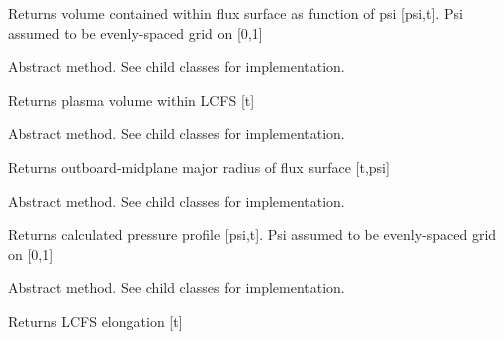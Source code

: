 \documentclass[letterpaper,10pt,english]{sphinxmanual}
\begin{document}
\begin{fulllineitems}
\begin{fulllineitems}
Returns volume contained within flux surface as function of psi {[}psi,t{]}.
Psi assumed to be evenly-spaced grid on {[}0,1{]}

\end{fulllineitems}


\begin{fulllineitems}
\label{eqtools:eqtools.core.Equilibrium.getVolLCFS}
Abstract method.  See child classes for implementation.

Returns plasma volume within LCFS {[}t{]}

\end{fulllineitems}


\begin{fulllineitems}
\label{eqtools:eqtools.core.Equilibrium.getRmidPsi}
Abstract method.  See child classes for implementation.

Returns outboard-midplane major radius of flux surface {[}t,psi{]}

\end{fulllineitems}


\begin{fulllineitems}
\label{eqtools:eqtools.core.Equilibrium.getFluxPres}
Abstract method.  See child classes for implementation.

Returns calculated pressure profile {[}psi,t{]}.
Psi assumed to be evenly-spaced grid on {[}0,1{]}

\end{fulllineitems}


\begin{fulllineitems}
\label{eqtools:eqtools.core.Equilibrium.getElongation}
Abstract method.  See child classes for implementation.

Returns LCFS elongation {[}t{]}

\end{fulllineitems}



\end{fulllineitems}
\end{document}
